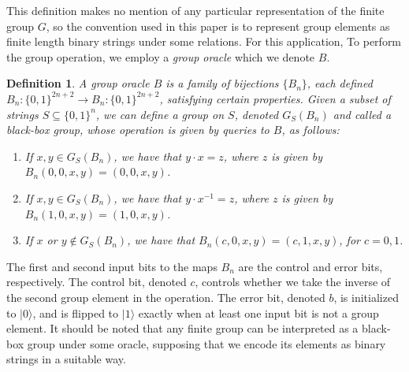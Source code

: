 \documentclass[12pt]{article}
\newtheorem*{defn}{Definition}
\newcommand{\ket}[1]{\vert #1 \rangle}
\begin{document}
	This definition makes no mention of any particular representation of the finite group $G$, so the convention used in this paper is to represent group elements as finite length binary strings under some relations. For this application, To perform the group operation, we employ a \textit{group oracle} which we denote $B$. 
	\begin{defn}
		A group oracle $B$ is a family of bijections $\{B_n\}$, each defined $B_n\colon \{0,1\}^{2n+2}\to B_n\colon \{0,1\}^{2n+2}$, satisfying certain properties. Given a subset of strings $S\subseteq \{0,1\}^n$, we can define a group on $S$, denoted $G_S(B_n)$ and called a \textit{black-box group}, whose operation is given by queries to $B$, as follows:
		\begin{enumerate}
			\item If $x,y\in G_S(B_n)$, we have that $y\cdot x=z$, where $z$ is given by $B_n(0,0,x,y)=(0,0,x,y)$.
			\item If $x,y\in G_S(B_n)$, we have that $y\cdot x^{-1}=z$, where $z$ is given by $B_n(1,0,x,y)=(1,0,x,y)$.
			\item If $x$ or $y\notin G_S(B_n)$, we have that $B_n(c,0,x,y)=(c,1,x,y)$, for $c=0,1$.
		\end{enumerate}
	\end{defn}
	The first and second input bits to the maps $B_n$ are the control and error bits, respectively. The control bit, denoted $c$, controls whether we take the inverse of the second group element in the operation. The error bit, denoted $b$, is initialized to $\ket{0}$, and is flipped to $\ket{1}$ exactly when at least one input bit is not a group element. It should be noted that any finite group can be interpreted as a black-box group under some oracle, supposing that we encode its elements as binary strings in a suitable way.\\
	
\end{document}
